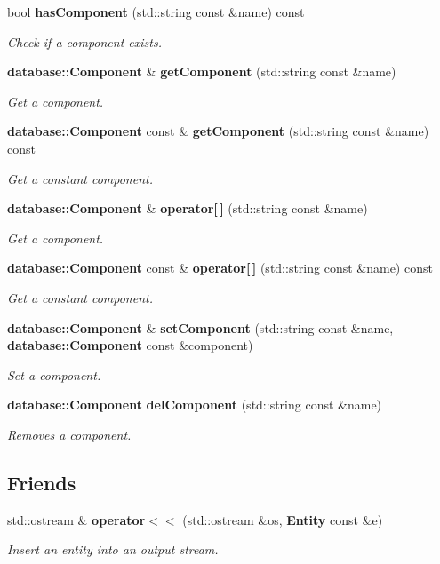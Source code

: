 \begin{DoxyCompactItemize}
bool {\bf has\+Component} (std\+::string const \&name) const
\begin{DoxyCompactList}\small\item\em Check if a component exists. \end{DoxyCompactList}\item 
{\bf database\+::\+Component} \& {\bf get\+Component} (std\+::string const \&name)
\begin{DoxyCompactList}\small\item\em Get a component. \end{DoxyCompactList}\item 
{\bf database\+::\+Component} const  \& {\bf get\+Component} (std\+::string const \&name) const
\begin{DoxyCompactList}\small\item\em Get a constant component. \end{DoxyCompactList}\item 
{\bf database\+::\+Component} \& {\bf operator[$\,$]} (std\+::string const \&name)
\begin{DoxyCompactList}\small\item\em Get a component. \end{DoxyCompactList}\item 
{\bf database\+::\+Component} const  \& {\bf operator[$\,$]} (std\+::string const \&name) const
\begin{DoxyCompactList}\small\item\em Get a constant component. \end{DoxyCompactList}\item 
{\bf database\+::\+Component} \& {\bf set\+Component} (std\+::string const \&name, {\bf database\+::\+Component} const \&component)
\begin{DoxyCompactList}\small\item\em Set a component. \end{DoxyCompactList}\item 
{\bf database\+::\+Component} {\bf del\+Component} (std\+::string const \&name)
\begin{DoxyCompactList}\small\item\em Removes a component. \end{DoxyCompactList}\end{DoxyCompactItemize}
\subsection*{Friends}
\begin{DoxyCompactItemize}
\item 
std\+::ostream \& {\bf operator$<$$<$} (std\+::ostream \&os, {\bf Entity} const \&e)
\begin{DoxyCompactList}\small\item\em Insert an entity into an output stream. \end{DoxyCompactList}\end{DoxyCompactItemize}


